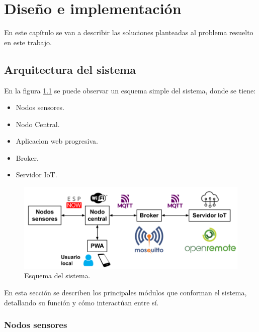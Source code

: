 \chapter{Diseño e implementación} %

En este capítulo se van a describir las soluciones planteadas al problema resuelto en este trabajo.

\section{Arquitectura del sistema}

En la figura \ref{fig:arqSistema} se puede observar un esquema simple del sistema, donde se tiene:

\begin{itemize}
	\item Nodos sensores.
	\item Nodo Central.
	\item Aplicacion web progresiva.
	\item Broker.
	\item Servidor IoT.
\end{itemize}

\begin{figure}[H]
\centering 
\includegraphics[width=1\textwidth]{./Figures/arq_sistema.png}
\caption{Esquema del sistema.}
\label{fig:arqSistema}
\end{figure}

En esta sección se describen los principales módulos que conforman el sistema, detallando su función y cómo interactúan entre sí.

\subsection{Nodos sensores} 

